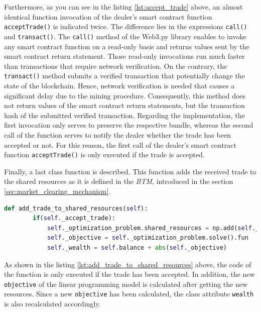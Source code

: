 Furthermore, as you can see in the listing \ref{lst:accept_trade} above, an almost identical function invocation of the dealer's smart contract 
function \verb|acceptTrade()| is indicated twice. 
The difference lies in the expressions \verb|call()| and \verb|transact()|. 
The \verb|call()| method of the Web3.py library enables to invoke any smart contract function on a read-only basis
and returns values sent by the smart contract return statement. 
Those read-only invocations run much faster than transactions that require network verification.
On the contrary, the \verb|transact()| method submits a verified transaction that potentially change the state 
of the blockchain. 
Hence, network verification is needed that causes a significant delay due to the mining procedure.
Consequently, this method does not return values of the smart contract return statements,
but the transaction hash of the submitted verified transaction.
Regarding the implementation, the first invocation only serves to preserve the respective bundle,
whereas the second call of the function serves to notify the dealer whether the trade has been accepted or not.
For this reason, the first call of the dealer's smart contract 
function \verb|acceptTrade()| is only executed if the trade is accepted. 

Finally, a last class function is described. This function adds the received trade to the shared resources
as it is defined in the \textit{BTM}, introduced in the section \ref{sec:market_clearing_mechanism}.

\begin{lstlisting}[float=htbp, label=lst:add_trade_to_shared_resources, caption=Adding of trade to shared resources, language=Python]
    def add_trade_to_shared_resources(self):
        if(self._accept_trade):
            self._optimization_problem.shared_resources = np.add(self._optimization_problem.shared_resources, self._trade)
            self._objective = self._optimization_problem.solve().fun  
            self._wealth = self.balance + abs(self._objective)
\end{lstlisting}

As shown in the listing \ref{lst:add_trade_to_shared_resources} above, the code of the function 
is only executed if the trade has been accepted. 
In addition, the new \verb|objective| of the linear programming model is calculated after getting the new resources.
Since a new \verb|objective| has been calculated, the class attribute \verb|wealth| is also recalculated accordingly.



